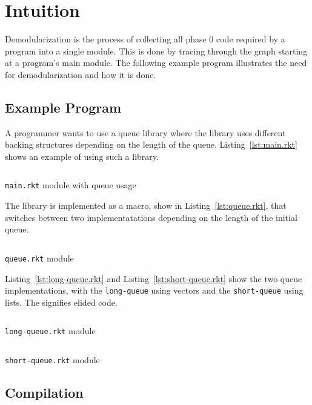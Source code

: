 \chapter{Intuition}
Demodularization is the process of collecting all phase 0 code required by a program into a single module.
This is done by tracing through the  graph starting at a program's main module.
The following example program illustrates the need for demodularization and how it is done.

\section{Example Program}
A programmer wants to use a queue library where the library uses different backing structures depending on the length of the queue. 
Listing~\ref{lst:main.rkt} shows an example of using such a library.
\begin{listing}
  \inputminted{racket}{listings/main.rkt}
  \caption{\texttt{main.rkt} module with queue usage}
  \label{lst:main.rkt}
\end{listing}
The library is implemented as a macro, show in Listing~\ref{lst:queue.rkt}, that switches between two implementatations depending on the length of the initial queue.
\begin{listing}
  \inputminted{racket}{listings/queue.rkt}
  \caption{\texttt{queue.rkt} module}
  \label{lst:queue.rkt}
\end{listing}
Listing~\ref{lst:long-queue.rkt} and Listing~\ref{lst:short-queue.rkt} show the two queue implementations, with the \texttt{long-queue} using vectors and the \texttt{short-queue} using lists. 
The  signifies elided code.

\begin{listing}
  \inputminted{racket}{listings/long-queue.rkt}
  \caption{\texttt{long-queue.rkt} module}
  \label{lst:long-queue.rkt}
\end{listing}

\begin{listing}
  \inputminted{racket}{listings/short-queue.rkt}
  \caption{\texttt{short-queue.rkt} module}
  \label{lst:short-queue.rkt}
\end{listing}


\section{Compilation}

